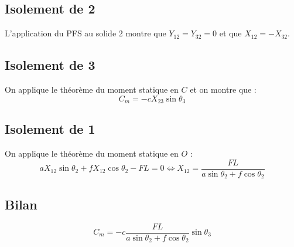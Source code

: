 \documentclass[10pt,fleqn]{article} %
\begin{document}
\subsection{Isolement de 2}
L'application du PFS au solide 2 montre que $Y_{12}=Y_{32}=0$ et que $X_{12}=-X_{32}$.


\subsection{Isolement de 3}
On applique le théorème du moment statique en $C$ et on montre que : 
$$C_m = - c X_{23} \sin \theta_3 $$

\subsection{Isolement de 1}
On applique le théorème du moment statique en $O$  : 
$$ a  X_{12} \sin\theta_2  +f   X_{12} \cos \theta_2  -FL =0 \Leftrightarrow 
  X_{12}=\dfrac{FL}{a \sin\theta_2 +f  \cos \theta_2 }$$

\subsection{Bilan}

$$C_m = - c \dfrac{FL}{a \sin\theta_2 +f  \cos \theta_2 }\sin \theta_3 $$
\end{document}
